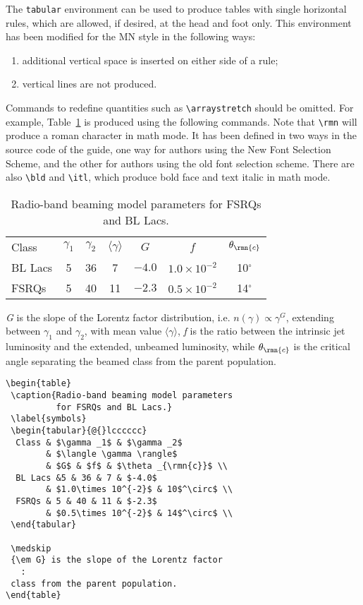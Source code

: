 The \verb"tabular" environment can be used to produce tables with
single horizontal rules, which are allowed, if desired, at the head and
foot only. This environment has been modified for the MN style in the
following ways:
%
\begin{enumerate}
  \item additional vertical space is inserted on either side of a rule;
  \item vertical lines are not produced.
\end{enumerate}
%
Commands to redefine quantities such as \verb"\arraystretch" should be
omitted. For example, Table~\ref{symbols} is produced using the
following commands. Note that \verb"\rmn" will produce a roman character 
in math mode. It has been defined in two ways in the source code of
the guide, one way for authors using the New Font Selection Scheme, and 
the other for authors using the old font selection scheme. There are
also \verb"\bld" and \verb"\itl", which produce bold face and text italic
in math mode.
\begin{table}
 \caption{Radio-band beaming model parameters 
          for FSRQs and BL Lacs.}
 \label{symbols}
 \begin{tabular}{@{}lcccccc}
  Class & $\gamma _1$ & $\gamma _2$ 
        & $\langle \gamma \rangle$
        & $G$ & $f$ & $\theta _{\rmn{c}}$ \\
  BL Lacs &5 & 36 & 7 & $-4.0$ 
        & $1.0\times 10^{-2}$ & 10$^\circ$ \\
  FSRQs & 5 & 40 & 11 & $-2.3$ 
        & $0.5\times 10^{-2}$ & 14$^\circ$ \\
 \end{tabular}

 \medskip
 {\em G} is the slope of the Lorentz factor distribution, i.e.
 $n(\gamma)\propto \gamma ^G$, extending between $\gamma _1$ and
 $\gamma_2$, with mean value $\langle \gamma \rangle$, {\em f\/} is the
 ratio between the intrinsic jet luminosity and the extended, unbeamed
 luminosity, while $\theta_{\rmn{c}}$ is the critical angle separating
 the beamed class from the parent population.
\end{table}
\begin{verbatim}
\begin{table}
 \caption{Radio-band beaming model parameters 
          for FSRQs and BL Lacs.}
 \label{symbols}
 \begin{tabular}{@{}lcccccc}
  Class & $\gamma _1$ & $\gamma _2$ 
        & $\langle \gamma \rangle$
        & $G$ & $f$ & $\theta _{\rmn{c}}$ \\
  BL Lacs &5 & 36 & 7 & $-4.0$ 
        & $1.0\times 10^{-2}$ & 10$^\circ$ \\
  FSRQs & 5 & 40 & 11 & $-2.3$ 
        & $0.5\times 10^{-2}$ & 14$^\circ$ \\
 \end{tabular}

 \medskip
 {\em G} is the slope of the Lorentz factor 
   :
 class from the parent population.
\end{table}
\end{verbatim}
